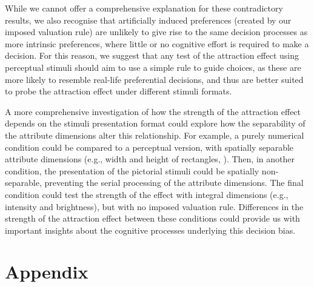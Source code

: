 \documentclass[11pt,a4paper]{article}
\begin{document}
While we cannot offer a comprehensive explanation for these contradictory results, we also recognise that artificially induced preferences (created by our imposed valuation rule) are unlikely to give rise to the same decision processes as more  intrinsic preferences, where little or no cognitive effort is required to make a decision. For this reason, we suggest that any test of the attraction effect using perceptual stimuli should aim to use a simple rule to guide choices, as these are more likely to resemble real-life preferential decisions, and thus are better suited to probe the attraction effect under different stimuli formats. 

A more comprehensive investigation of how the strength of the attraction effect depends on the stimuli presentation format could explore how the separability of the attribute dimensions alter this relationship. For example, a purely numerical condition could be compared to a perceptual version, with spatially separable attribute dimensions (e.g., width and height of rectangles, ). Then, in another condition, the presentation of the pictorial stimuli could be spatially non-separable, preventing the serial processing of the attribute dimensions. The final condition could test the strength of the effect with integral dimensions (e.g., intensity and brightness), but with no imposed valuation rule. Differences in the strength of the attraction effect between these conditions could provide us with important insights about the cognitive processes underlying this decision bias.




\newpage




\section{Appendix}
\end{document}

